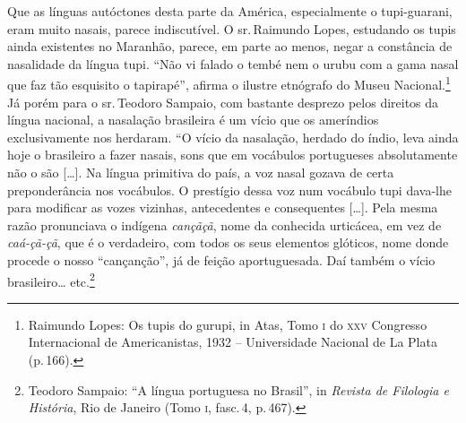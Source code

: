Que as línguas autóctones desta parte da América, especialmente o
tupi-guarani, eram muito nasais, parece indiscutível. O sr.\,Raimundo
Lopes, estudando os tupis ainda existentes no Maranhão, parece, em parte
ao menos, negar a constância de nasalidade da língua tupi. ``Não vi
falado o tembé nem o urubu com a gama nasal que faz tão esquisito o
tapirapé'', afirma o ilustre etnógrafo do Museu Nacional.\footnote{Raimundo Lopes: Os tupis do gurupi, in Atas, Tomo \textsc{i} do \textsc{xxv} Congresso
Internacional de Americanistas, 1932 -- Universidade Nacional de La
Plata (p.\,166).} Já porém
para o sr.\,Teodoro Sampaio, com bastante desprezo pelos direitos da
língua nacional, a nasalação brasileira é um vício que os ameríndios
exclusivamente nos herdaram. ``O vício da nasalação, herdado do índio,
leva ainda hoje o brasileiro a fazer nasais, sons que em vocábulos
portugueses absolutamente não o são {[}\ldots{}{]}. Na língua primitiva do
país, a voz nasal gozava de certa preponderância nos vocábulos. O
prestígio dessa voz num vocábulo tupi dava-lhe para modificar as vozes
vizinhas, antecedentes e consequentes {[}\ldots{}{]}. Pela mesma razão
pronunciava o indígena \textit{cançãçã}, nome da conhecida urticácea, em vez
de \textit{caá-çã-çã}, que é o verdadeiro, com todos os seus elementos
glóticos, nome donde procede o nosso ``cançanção'', já de feição
aportuguesada. Daí também o vício brasileiro\ldots{} etc.\footnote{Teodoro Sampaio: ``A língua portuguesa no Brasil'', in \textit{Revista de
Filologia e História}, Rio de Janeiro (Tomo \textsc{i}, fasc.\,4, p.\,467).}

